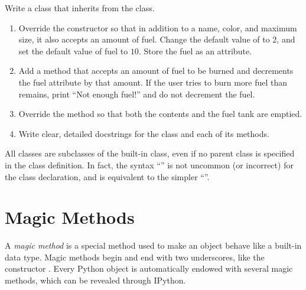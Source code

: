 \begin{problem} %
Write a  class that inherits from the  class.
\begin{enumerate}
\item Override the constructor so that in addition to a name, color, and maximum size, it also accepts an amount of fuel.
Change the default value of  to $2$, and set the default value of fuel to $10$.
Store the fuel as an attribute.

\item Add a  method that accepts an amount of fuel to be burned and decrements the fuel attribute by that amount.
If the user tries to burn more fuel than remains, print ``Not enough fuel!'' and do not decrement the fuel.

\item Override the  method so that both the contents and the fuel tank are emptied. %

\item Write clear, detailed docstrings for the class and each of its methods.
\end{enumerate}
\end{problem}

\begin{info}
All classes are subclasses of the built-in  class, even if no parent class is specified in the class definition.
In fact, the syntax ``'' is not uncommon (or incorrect) for the class declaration, and is equivalent to the simpler ``''.
\end{info}

\section*{Magic Methods} %

A \emph{magic method} is a special method used to make an object behave like a built-in data type.
Magic methods begin and end with two underscores, like the constructor .
Every Python object is automatically endowed with several magic methods, which can be revealed through IPython.


